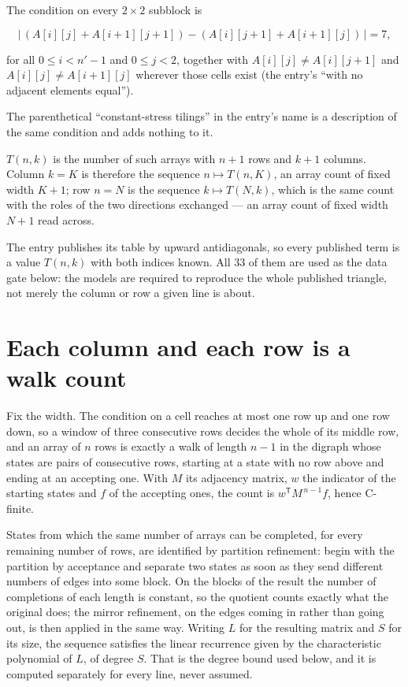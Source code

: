 \documentclass[11pt]{article}
\theoremstyle{definition}
\begin{document}
The condition on every $2 \times 2$ subblock is

\[\bigl|\,(A[i][j] + A[i{+}1][j{+}1]) - (A[i][j{+}1] + A[i{+}1][j])\,\bigr| = 7,\]

for all $0 \le i < n'-1$ and $0 \le j < 2$, together with $A[i][j] \ne A[i][j{+}1]$ and $A[i][j] \ne A[i{+}1][j]$ wherever those cells exist (the entry's ``with no adjacent elements equal'').

The parenthetical ``constant-stress tilings'' in the entry's name is a description of the same condition and adds nothing to it.

$T(n,k)$ is the number of such arrays with $n + 1$ rows and $k + 1$ columns. Column $k = K$ is therefore the sequence $n \mapsto T(n,K)$, an array count of fixed width $K + 1$; row $n = N$ is the sequence $k \mapsto T(N,k)$, which is the same count with the roles of the two directions exchanged --- an array count of fixed width $N + 1$ read across.

The entry publishes its table by upward antidiagonals, so every published term is a value $T(n,k)$ with both indices known. All 33 of them are used as the data gate below: the models are required to reproduce the whole published triangle, not merely the column or row a given line is about.

\section{Each column and each row is a walk count}

Fix the width. The condition on a cell reaches at most one row up and one row down, so a window of three consecutive rows decides the whole of its middle row, and an array of $n$ rows is exactly a walk of length $n-1$ in the digraph whose states are pairs of consecutive rows, starting at a state with no row above and ending at an accepting one. With $M$ its adjacency matrix, $w$ the indicator of the starting states and $f$ of the accepting ones, the count is $w^{\mathsf T}M^{\,n-1}f$, hence C-finite.

States from which the same number of arrays can be completed, for every remaining number of rows, are identified by partition refinement: begin with the partition by acceptance and separate two states as soon as they send different numbers of edges into some block. On the blocks of the result the number of completions of each length is constant, so the quotient counts exactly what the original does; the mirror refinement, on the edges coming in rather than going out, is then applied in the same way. Writing $L$ for the resulting matrix and $S$ for its size, the sequence satisfies the linear recurrence given by the characteristic polynomial of $L$, of degree $S$. That is the degree bound used below, and it is computed separately for every line, never assumed.
\end{document}
